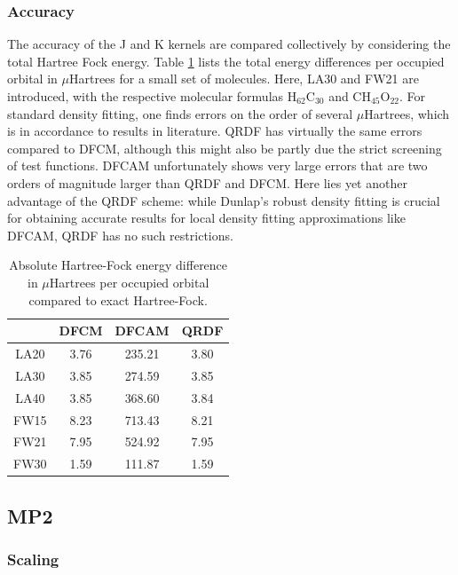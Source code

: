 \subsubsection{Accuracy}

The accuracy of the J and K kernels are compared collectively by considering the total Hartree Fock energy. Table \ref{tab:GSHFACCURACY} lists the total energy differences per occupied orbital in $\mu$Hartrees for a small set of molecules. Here, LA30 and FW21 are introduced, with the respective molecular formulas H$_62$C$_30$ and CH$_45$O$_22$. For standard density fitting, one finds errors on the order of several $\mu$Hartrees, which is in accordance to results in literature. QRDF has virtually the same errors compared to DFCM, although this might also be partly due the strict screening of test functions. DFCAM unfortunately shows very large errors that are two orders of magnitude larger than QRDF and DFCM. Here lies yet another advantage of the QRDF scheme: while Dunlap's robust density fitting is crucial for obtaining accurate results for local density fitting approximations like DFCAM, QRDF has no such restrictions. 

\begin{table}
\centering
\begin{tabular}{cccc}
 \hline
 & DFCM & DFCAM & QRDF \\ \hline 
LA20 & 3.76 & 235.21 & 3.80 \\ 
LA30  & 3.85 & 274.59 & 3.85 \\ 
LA40 & 3.85 & 368.60 & 3.84 \\ 
FW15 & 8.23 & 713.43 & 8.21 \\ 
FW21 & 7.95 & 524.92 & 7.95 \\ 
FW30 & 1.59 & 111.87 & 1.59 \\ 
\hline 
\end{tabular}
\label{tab:GSHFACCURACY}
\caption{Absolute Hartree-Fock energy difference in $\mu$Hartrees per occupied orbital compared to exact Hartree-Fock.}
\end{table}

\subsection{MP2}

\subsubsection{Scaling}

